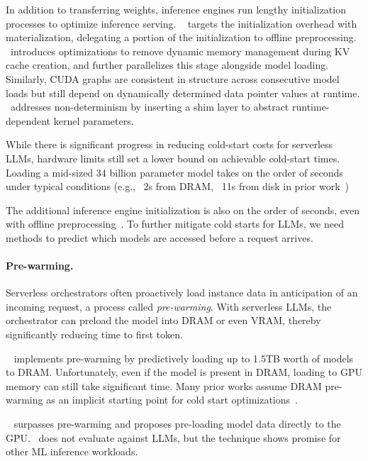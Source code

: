 
In addition to transferring weights, inference engines run lengthy initialization processes to optimize inference serving.
\Medusa~\cite{medusa} targets the initialization overhead with materialization, delegating a portion of the initialization to offline preprocessing.
\Medusa~introduces optimizations to remove dynamic memory management during KV cache creation, and further parallelizes this stage alongside model loading.
Similarly, CUDA graphs are consistent in structure across consecutive model loads but still depend on dynamically determined data pointer values at runtime.
\Medusa~addresses non-determinism by inserting a shim layer to abstract runtime-dependent kernel parameters.

While there is significant progress in reducing cold-start costs for serverless LLMs, hardware limits still set a lower bound on achievable cold-start times.
Loading a mid-sized 34 billion parameter model takes on the order of seconds under typical conditions (e.g., ~2s from DRAM, ~11s from disk in prior work~\cite{deepserve})

The additional inference engine initialization is also on the order of seconds, even with offline preprocessing~\cite{medusa}.
To further mitigate cold starts for LLMs, we need methods to predict which models are accessed before a request arrives.

\paragraph{Pre-warming.}
Serverless orchestrators often proactively load instance data in anticipation of an incoming request, a process called \emph{pre-warming}.
With serverless LLMs, the orchestrator can preload the model into DRAM or even VRAM, thereby significantly reducing time to first token.

\DEEPSERVE~\cite{deepserve} implements pre-warming by predictively loading up to 1.5TB worth of models to DRAM.
Unfortunately, even if the model is present in DRAM, loading to GPU memory can still take significant time.
Many prior works assume DRAM pre-warming as an implicit starting point for cold start optimizations~\cite{serverlesslora, pipeboost, medusa, slinfer}.

\InstaInfer~\cite{prewarm-not-enough} surpasses pre-warming and proposes pre-loading model data directly to the GPU.
\InstaInfer~does not evaluate against LLMs, but the technique shows promise for other ML inference workloads.

